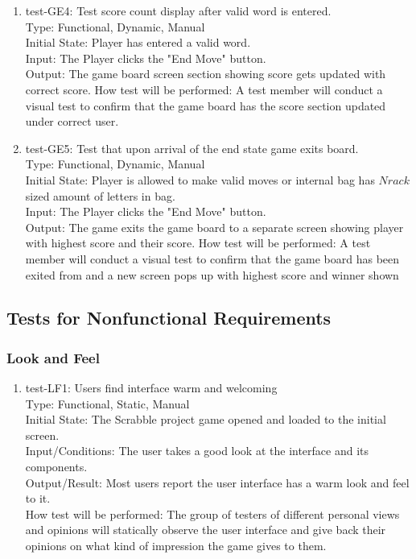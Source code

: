 \documentclass[12pt, titlepage]{article}
\begin{document}
\begin{enumerate}
    \item{test-GE4: Test score count display after valid word is entered.\\} %
    Type: Functional, Dynamic, Manual\\
    Initial State: Player has entered a valid word. \\
    Input: The Player clicks the "End Move" button.\\
    Output: The game board screen section showing score gets updated with correct score.
    How test will be performed: A test member will conduct a visual test to confirm that the game board has the score section updated under correct user.\\
    
    \item{test-GE5: Test that upon arrival of the end state game exits board.\\} %
    Type: Functional, Dynamic, Manual\\
    Initial State: Player is allowed to make valid moves or internal bag has $N rack$ sized amount of letters in bag. \\
    Input: The Player clicks the "End Move" button.\\
    Output: The game exits the game board to a separate screen showing player with highest score and their score.
    How test will be performed: A test member will conduct a visual test to confirm that the game board has been exited from and a new screen pops up with highest score and winner shown\\
\end{enumerate}
    
\subsection{Tests for Nonfunctional Requirements}%

\subsubsection{Look and Feel}
\begin{enumerate}

\item{test-LF1: Users find interface warm and welcoming}\\
    Type: Functional, Static, Manual\\
    Initial State: The Scrabble project game opened and loaded to the initial screen.\\
    Input/Conditions: The user takes a good look at the interface and its components.\\
    Output/Result: Most users report the user interface has a warm look and feel to it.\\
    How test will be performed: The group of testers of different personal views and opinions will statically observe the user interface and give back their opinions on what kind of impression the game gives to them.\\
\end{enumerate}
\end{document}

